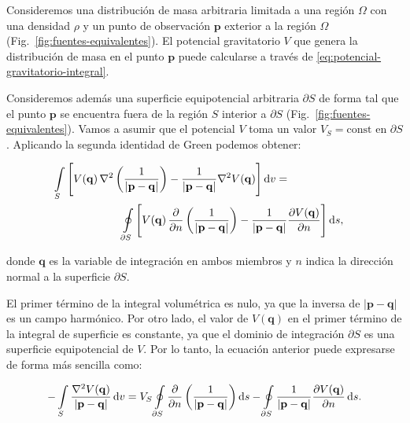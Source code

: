 Consideremos una distribución de masa arbitraria limitada a una región $\Omega$
con una densidad $\rho$ y un punto de observación $\mathbf{p}$ exterior a la
región $\Omega$ (Fig.~\ref{fig:fuentes-equivalentes}).
El potencial gravitatorio $V$ que genera la distribución de masa en el punto
$\mathbf{p}$ puede calcularse a través de
\ref{eq:potencial-gravitatorio-integral}.

Consideremos además una superficie equipotencial arbitraria $\partial S$ de
forma tal que el punto $\mathbf{p}$ se encuentra fuera de la región $S$
interior a $\partial S$ (Fig.~\ref{fig:fuentes-equivalentes}).
Vamos a asumir que el potencial $V$ toma un valor $V_S = \text{const}$ en
$\partial S$.
Aplicando la segunda identidad de Green \citep[][p.~23]{blakely1995} podemos
obtener:

\begin{equation}
    \begin{split}
    \int\limits_S
        \Bigg[
            V(\mathbf{q}) \,
            \nabla^2 \left( \frac{1}{|\mathbf{p} - \mathbf{q}|} \right)
            - \frac{1}{|\mathbf{p} - \mathbf{q}|}  \nabla^2 V(\mathbf{q})
        \Bigg]
    \mathop{}\!\textnormal{d} v
    = \\
    \oint\limits_{\partial S}
        \Bigg[
            V(\mathbf{q}) \,
            \frac{\partial}{\partial n}
            \left( \frac{1}{|\mathbf{p} - \mathbf{q}|} \right)
            -
            \frac{1}{|\mathbf{p} - \mathbf{q}|}
            &\frac{\partial V(\mathbf{q})}{\partial n}
        \Bigg]
    \mathop{}\!\textnormal{d} s,
    \end{split}
\end{equation}

\noindent donde $\mathbf{q}$ es la variable de integración en ambos miembros
y $n$ indica la dirección normal a la superficie $\partial S$.

El primer término de la integral volumétrica es nulo, ya que la inversa de
$|\mathbf{p} - \mathbf{q}|$ es un campo harmónico.
Por otro lado, el valor de $V(\mathbf{q})$ en el primer término de la integral
de superficie es constante, ya que el dominio de integración $\partial S$ es
una superficie equipotencial de $V$.
Por lo tanto, la ecuación anterior puede expresarse de forma más sencilla como:

\begin{equation}
    - \int\limits_S
        \frac{\nabla^2 V(\mathbf{q})}{|\mathbf{p} - \mathbf{q}|}
    \mathop{}\!\textnormal{d} v
    =
    V_S
    \oint\limits_{\partial S}
        \frac{\partial}{\partial n}
        \left( \frac{1}{|\mathbf{p} - \mathbf{q}|} \right)
    \mathop{}\!\textnormal{d} s
    - \oint\limits_{\partial S}
        \frac{1}{|\mathbf{p} - \mathbf{q}|}
        \frac{\partial V(\mathbf{q})}{\partial n}
    \mathop{}\!\textnormal{d} s.
\end{equation}

